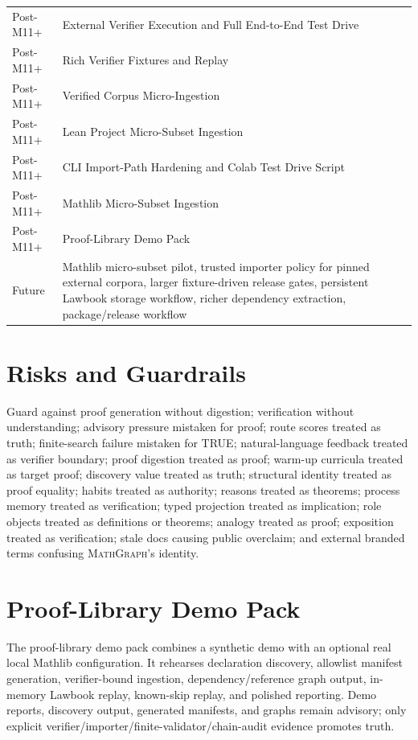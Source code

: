 \documentclass[11pt,a4paper]{article}
\newcommand{\MG}{\textsc{MathGraph}}
\begin{document}
\begin{longtable}{ll}
Post-M11+ & External Verifier Execution and Full End-to-End Test Drive\\
Post-M11+ & Rich Verifier Fixtures and Replay\\
Post-M11+ & Verified Corpus Micro-Ingestion\\
Post-M11+ & Lean Project Micro-Subset Ingestion\\
Post-M11+ & CLI Import-Path Hardening and Colab Test Drive Script\\
Post-M11+ & Mathlib Micro-Subset Ingestion\\
Post-M11+ & Proof-Library Demo Pack\\
\midrule
Future & Mathlib micro-subset pilot, trusted importer policy for pinned external corpora, larger fixture-driven release gates, persistent Lawbook storage workflow, richer dependency extraction, package/release workflow\\
\bottomrule
\end{longtable}

\section{Risks and Guardrails}
Guard against proof generation without digestion; verification without understanding; advisory pressure mistaken for proof; route scores treated as truth; finite-search failure mistaken for TRUE; natural-language feedback treated as verifier boundary; proof digestion treated as proof; warm-up curricula treated as target proof; discovery value treated as truth; structural identity treated as proof equality; habits treated as authority; reasons treated as theorems; process memory treated as verification; typed projection treated as implication; role objects treated as definitions or theorems; analogy treated as proof; exposition treated as verification; stale docs causing public overclaim; and external branded terms confusing \MG{}'s identity.

\section{Proof-Library Demo Pack}
The proof-library demo pack combines a synthetic demo with an optional real local Mathlib configuration. It rehearses declaration discovery, allowlist manifest generation, verifier-bound ingestion, dependency/reference graph output, in-memory Lawbook replay, known-skip replay, and polished reporting. Demo reports, discovery output, generated manifests, and graphs remain advisory; only explicit verifier/importer/finite-validator/chain-audit evidence promotes truth.
\end{document}
